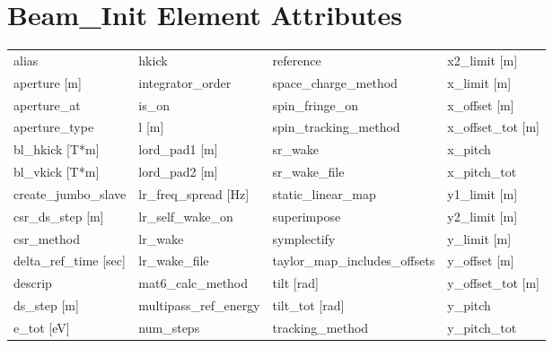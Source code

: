  \section{Beam_Init Element Attributes}
 \label{s:list.beam.init}
 
 \begin{tabular}{llll} \toprule
alias                            & hkick                            & reference                        & x2_limit [m]                     \\
aperture [m]                     & integrator_order                 & space_charge_method              & x_limit [m]                      \\
aperture_at                      & is_on                            & spin_fringe_on                   & x_offset [m]                     \\
aperture_type                    & l [m]                            & spin_tracking_method             & x_offset_tot [m]                 \\
bl_hkick [T*m]                   & lord_pad1 [m]                    & sr_wake                          & x_pitch                          \\
bl_vkick [T*m]                   & lord_pad2 [m]                    & sr_wake_file                     & x_pitch_tot                      \\
create_jumbo_slave               & lr_freq_spread [Hz]              & static_linear_map                & y1_limit [m]                     \\
csr_ds_step [m]                  & lr_self_wake_on                  & superimpose                      & y2_limit [m]                     \\
csr_method                       & lr_wake                          & symplectify                      & y_limit [m]                      \\
delta_ref_time [sec]             & lr_wake_file                     & taylor_map_includes_offsets      & y_offset [m]                     \\
descrip                          & mat6_calc_method                 & tilt [rad]                       & y_offset_tot [m]                 \\
ds_step [m]                      & multipass_ref_energy             & tilt_tot [rad]                   & y_pitch                          \\
e_tot [eV]                       & num_steps                        & tracking_method                  & y_pitch_tot                      \\

\end{tabular}
